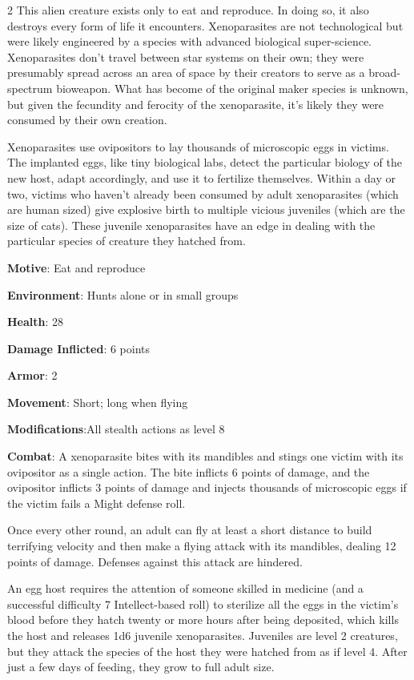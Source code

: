 \begin{multicols}{2}
This alien creature exists only to eat and reproduce. In doing so, it also destroys every form of life it encounters. Xenoparasites are not technological but were likely engineered by a species with advanced biological super-science. Xenoparasites don’t travel between star systems on their own; they were presumably spread across an area of space by their creators to serve as a broad-spectrum bioweapon. What has become of the original maker species is unknown, but given the fecundity and ferocity of the xenoparasite, it’s likely they were consumed by their own creation.

Xenoparasites use ovipositors to lay thousands of microscopic eggs in victims. The implanted eggs, like tiny biological labs, detect the particular biology of the new host, adapt accordingly, and use it to fertilize themselves. Within a day or two, victims who haven’t already been consumed by adult xenoparasites (which are human sized) give explosive birth to multiple vicious juveniles (which are the size of cats). These juvenile xenoparasites have an edge in dealing with the particular species of creature they hatched from.

\textbf{Motive}: Eat and reproduce

\textbf{Environment}: Hunts alone or in small groups

\textbf{Health}: 28

\textbf{Damage Inflicted}: 6 points

\textbf{Armor}: 2

\textbf{Movement}: Short; long when flying

\textbf{Modifications}:All stealth actions as level 8

\textbf{Combat}: A xenoparasite bites with its mandibles and stings one victim with its ovipositor as a single action. The bite inflicts 6 points of damage, and the ovipositor inflicts 3 points of damage and injects thousands of microscopic eggs if the victim fails a Might defense roll.

Once every other round, an adult can fly at least a short distance to build terrifying velocity and then make a flying attack with its mandibles, dealing 12 points of damage. Defenses against this attack are hindered.

An egg host requires the attention of someone skilled in medicine (and a successful difficulty 7 Intellect-based roll) to sterilize all the eggs in the victim’s blood before they hatch twenty or more hours after being deposited, which kills the host and releases 1d6 juvenile xenoparasites. Juveniles are level 2 creatures, but they attack the species of the host they were hatched from as if level 4. After just a few days of feeding, they grow to full adult size.


\end{multicols}
